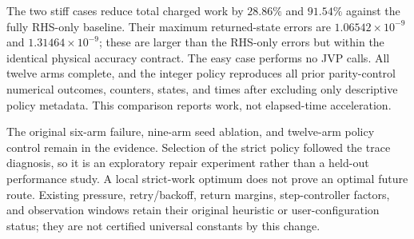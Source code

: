 The two stiff cases reduce total charged work by $28.86\%$ and $91.54\%$
against the fully RHS-only baseline. Their maximum returned-state errors are
$1.06542\times10^{-9}$ and $1.31464\times10^{-9}$; these are larger than the
RHS-only errors but within the identical physical accuracy contract. The easy
case performs no JVP calls. All twelve arms complete, and the integer policy
reproduces all prior parity-control numerical outcomes, counters, states,
and times after excluding only descriptive policy metadata. This comparison
reports work, not elapsed-time acceleration.

The original six-arm failure, nine-arm seed ablation, and twelve-arm policy
control remain in the evidence. Selection of the strict policy followed the
trace diagnosis, so it is an exploratory repair experiment rather than a
held-out performance study. A local strict-work optimum does not prove an
optimal future route. Existing pressure, retry/backoff, return margins,
step-controller factors, and observation windows retain their original
heuristic or user-configuration status; they are not certified universal
constants by this change.
